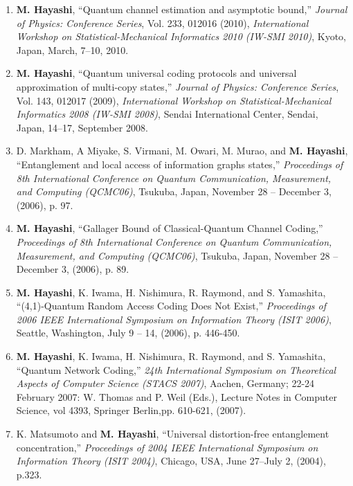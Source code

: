 \documentclass[a4paper,12pt,oneside]{article}
\begin{document}
\begin{enumerate}
\item   \textbf{M. Hayashi}, 
``Quantum channel estimation and asymptotic bound,'' 
{\em Journal of Physics: Conference Series}, Vol. 233, 012016 (2010), 
{\em International Workshop on Statistical-Mechanical Informatics 2010 (IW-SMI 2010)}, 
Kyoto, Japan, March, 7--10, 2010.

\item   \textbf{M. Hayashi}, 
``Quantum universal coding protocols and universal approximation of multi-copy states,'' 
{\em Journal of Physics: Conference Series}, Vol. 143, 012017 (2009), 
{\em International Workshop on Statistical-Mechanical Informatics 2008 (IW-SMI 2008)}, 
Sendai International Center, Sendai, Japan, 14--17, September 2008.

\item
D. Markham, A Miyake, S. Virmani, M. Owari, M. Murao, and \textbf{M. Hayashi},
``Entanglement and local access of information graphs states,''
{\em Proceedings of 8th International Conference on Quantum 
Communication, Measurement, and Computing (QCMC06)},
Tsukuba, Japan, November 28 -- December 3, (2006), p. 97.

\item
\textbf{M. Hayashi},
``Gallager Bound of Classical-Quantum Channel Coding,''
{\em Proceedings of 8th International Conference on Quantum 
Communication, Measurement, and Computing (QCMC06)},
Tsukuba, Japan, November 28 -- December 3, (2006), p. 89.

\item
\textbf{M. Hayashi}, K. Iwama, H. Nishimura, R. Raymond, and S. Yamashita, ``(4,1)-Quantum Random Access Coding Does Not Exist,'' 
{\em Proceedings of 2006 IEEE International Symposium on Information Theory (ISIT 2006)}, 
Seattle, Washington, July 9 -- 14, (2006), p. 446-450.

\item
\textbf{M. Hayashi}, K. Iwama, H. Nishimura, R. Raymond, and S. Yamashita, ``Quantum Network Coding,'' 
{\em 24th International Symposium on Theoretical Aspects of Computer Science (STACS 2007)}, Aachen, Germany; 22-24 February 2007: 
W. Thomas and P. Weil (Eds.), Lecture Notes in Computer Science, vol 4393, Springer Berlin,pp. 610-621, (2007). 

\item
K. Matsumoto and \textbf{M. Hayashi}, ``Universal distortion-free entanglement concentration,'' 
{\em Proceedings of 2004 IEEE International Symposium on Information Theory (ISIT 2004)}, 
Chicago, USA, June 27--July 2, (2004), p.323.


\end{enumerate}
\end{document}

